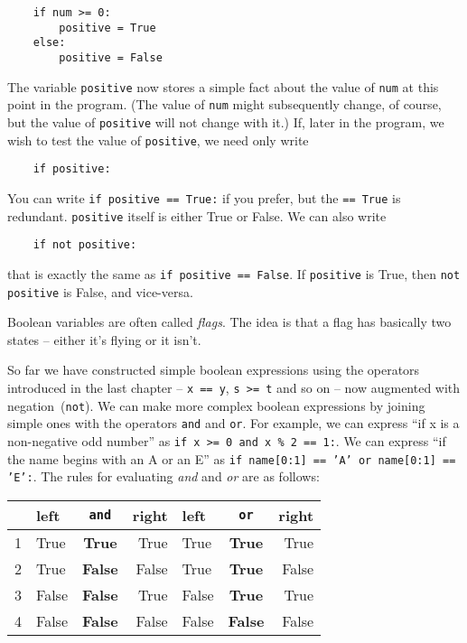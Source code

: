 \begin{Verbatim}
    if num >= 0:
        positive = True
    else:
        positive = False
\end{Verbatim}

The variable \texttt{positive} now stores a simple fact about the value of
 \texttt{num} at this point in the program.  (The value of  \texttt{num} might
subsequently change, of course, but the value of \texttt{positive} will not
change with it.)  If, later in the program, we wish to test
the value of \texttt{positive}, we need only write

\begin{Verbatim}
    if positive:
\end{Verbatim}

You can write \texttt{if positive == True:} if you prefer, but the
\texttt{== True} 
is redundant.  \texttt{positive} itself is either True or False.  
We can also write

\begin{Verbatim}
    if not positive:
\end{Verbatim}

that is exactly the same as \texttt{if positive == False}. If
\texttt{positive} is True, then \texttt{not positive} is False, and
vice-versa.

Boolean variables are often called \emph{flags}.  The idea is that
a flag has basically two states -- either it's flying or it isn't.

So far we have constructed simple boolean expressions using the operators
introduced in the last chapter -- \texttt{x == y}, \texttt{s >= t} and so on --
now augmented with negation~(\verb+not+).
We can make more complex boolean expressions by joining simple ones
with the operators \verb!and! and \verb!or!.  For example,
we can express ``if x is a non-negative odd number'' as
\verb+if x >= 0 and x % 2 == 1:+. We can express ``if the name begins
with an A or an E'' as \texttt{if name[0:1] == 'A' or
  name[0:1] == 'E':}.  The rules for evaluating \emph{and}
and \emph{or} are as follows:

\vspace{1em}
\begin{tabular}{|l|lcr||lcr|}
\hline
& left & \verb!and! & right & left & \verb+or+ & right\\
\hline
\hline
1 & True & \textbf{True} & True&True&\textbf{True}&True\\
2 & True & \textbf{False} & False&True&\textbf{True}&False\\
3 & False & \textbf{False} & True&False&\textbf{True}&True\\
4 & False & \textbf{False} & False&False&\textbf{False}&False\\
\hline
\end{tabular}
\vspace{1em}

